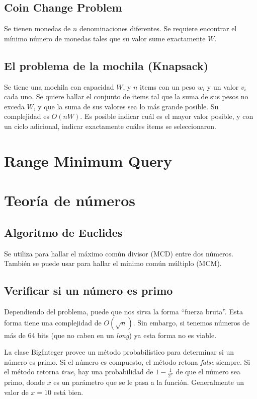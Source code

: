 \documentclass{article}
\begin{document}
\begin{multicols}{2}
	\subsection{Coin Change Problem}
	Se tienen monedas de \( n \) denominaciones diferentes. Se requiere encontrar el mínimo número de monedas tales que su valor sume exactamente \( W \).	
	
	\subsection{El problema de la mochila (Knapsack)}
	Se tiene una mochila con capacidad \( W \), y \( n \) items con un peso \( w_i \) y un valor \( v_i \) cada uno. Se quiere hallar el conjunto de items tal que la suma de sus pesos no exceda \( W \), y que la suma de sus valores sea lo más grande posible. Su complejidad es \( O(nW) \). Es posible indicar cuál es el mayor valor posible, y con un ciclo adicional, indicar exactamente cuáles items se seleccionaron.
	
	
\section{Range Minimum Query}


\section{Teoría de números}
	\subsection{Algoritmo de Euclides}
	Se utiliza para hallar el máximo común divisor (MCD) entre dos números. También se puede usar para hallar el mínimo común múltiplo (MCM).
	

	\subsection{Verificar si un número es primo}
	Dependiendo del problema, puede que nos sirva la forma ``fuerza bruta''. Esta forma tiene una complejidad de \( O(\sqrt{n}) \). Sin embargo, si tenemos números de más de 64 bits (que no caben en un \emph{long}) ya esta forma no es viable. 
	
	La clase BigInteger provee un método probabilístico para determinar si un número es primo. Si el número es compuesto, el método retona \emph{false} siempre. Si el método retorna \emph{true}, hay una probabilidad de \( 1-\frac{1}{2^x} \) de que el número sea primo, donde \(x\) es un parámetro que se le pasa a la función. Generalmente un valor de \(x = 10\) está bien.
	


\end{multicols}
\end{document}

